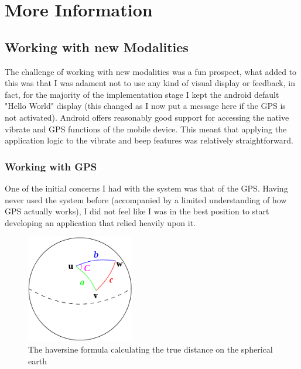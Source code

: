\documentclass[12pt]{article} %
\begin{document}
\newpage
\section{More Information}
\subsection{Working with new Modalities}

The challenge of working with new modalities was a fun prospect, what added to this was that I was
adament not to use any kind of visual display or feedback, in fact, for the majority of the
implementation stage I kept the android default "Hello World" display (this changed as I now put a
message here if the GPS is not activated). Android offers reasonably good support for accessing the
native vibrate and GPS functions of the mobile device. This meant that applying the application
logic to the vibrate and beep features was relatively straightforward.


\subsubsection{Working with GPS}

One of the initial concerns I had with the system was that of the GPS. Having never used the system
before (accompanied by a limited understanding of how GPS actually works), I did not feel like I
was in the best position to start developing an application that relied heavily upon it. \\

\begin{figure} %
 \begin{center}
    \includegraphics[width=0.42\textwidth]{haversine}
  \end{center}
  \parbox{0.45\textwidth}{\caption{The haversine formula calculating the true distance on the
spherical earth}}
\end{figure}
\end{document}
